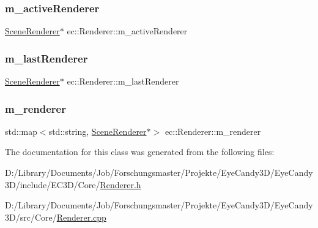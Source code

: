 \subsubsection{\texorpdfstring{m\+\_\+active\+Renderer}{m\_activeRenderer}}
{\footnotesize\ttfamily \mbox{\hyperlink{classec_1_1_scene_renderer}{Scene\+Renderer}}$\ast$ ec\+::\+Renderer\+::m\+\_\+active\+Renderer\hspace{0.3cm}{\ttfamily [protected]}}

\mbox{\label{classec_1_1_renderer_a818d84064fde8088d28358f7ea04f898}} 
\subsubsection{\texorpdfstring{m\+\_\+last\+Renderer}{m\_lastRenderer}}
{\footnotesize\ttfamily \mbox{\hyperlink{classec_1_1_scene_renderer}{Scene\+Renderer}}$\ast$ ec\+::\+Renderer\+::m\+\_\+last\+Renderer\hspace{0.3cm}{\ttfamily [protected]}}

\mbox{\label{classec_1_1_renderer_ac3f0c1c3253fbac0f734af313cc410a4}} 
\subsubsection{\texorpdfstring{m\+\_\+renderer}{m\_renderer}}
{\footnotesize\ttfamily std\+::map$<$std\+::string, \mbox{\hyperlink{classec_1_1_scene_renderer}{Scene\+Renderer}}$\ast$$>$ ec\+::\+Renderer\+::m\+\_\+renderer\hspace{0.3cm}{\ttfamily [protected]}}



The documentation for this class was generated from the following files\+:\begin{DoxyCompactItemize}
\item 
D\+:/\+Library/\+Documents/\+Job/\+Forschungsmaster/\+Projekte/\+Eye\+Candy3\+D/\+Eye\+Candy3\+D/include/\+E\+C3\+D/\+Core/\mbox{\hyperlink{_renderer_8h}{Renderer.\+h}}\item 
D\+:/\+Library/\+Documents/\+Job/\+Forschungsmaster/\+Projekte/\+Eye\+Candy3\+D/\+Eye\+Candy3\+D/src/\+Core/\mbox{\hyperlink{_renderer_8cpp}{Renderer.\+cpp}}\end{DoxyCompactItemize}
